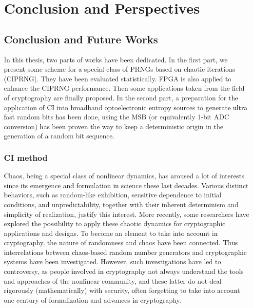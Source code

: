 \part{Conclusion and Perspectives}
\label{end con}
\chapter{Conclusion and Future Works}
In this thesis, two parts of works have been dedicated. In the first part, we present some scheme for a special class of PRNGs based on chaotic iterations (CIPRNG). They have been evaluated statistically. FPGA is also applied to enhance the CIPRNG performance. Then some applications taken from the field of cryptography are finally proposed. In the second part, a preparation for the application of CI into broadband optoelectronic entropy sources to generate ultra fast random bits has been done, using the MSB (or equivalently 1-bit ADC conversion) has been proven the way to keep a deterministic origin in the generation of a random bit sequence. 

\section{CI method}
Chaos, being a special class of nonlinear dynamics, has aroused a lot of interests since its emergence and formulation in science these last decades. Various distinct  behaviors, such as random-like exhibition, sensitive dependence to initial conditions, and unpredictability, together with their inherent determinism and simplicity of realization, justify this interest. More recently, some researchers have explored the possibility to apply these chaotic dynamics for cryptographic applications and designs. To become an element to take into account in cryptography, the nature of randomness and chaos have been connected. Thus interrelations between chaos-based random number generators and cryptographic systems have been investigated. However, such investigations have led to controversy, as people involved in cryptography not always understand the tools and approaches of the nonlinear community, and these latter do not deal rigorously (mathematically) with security, often forgetting to take into account one 
century of formalization and advances in cryptography.

